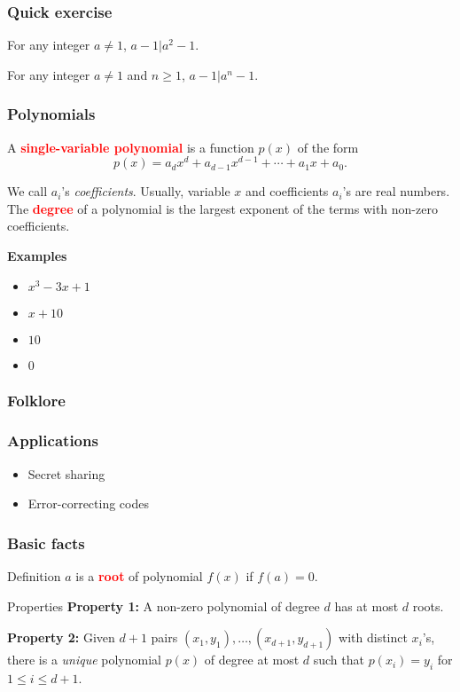 

\begin{frame}
  \frametitle{Quick exercise} 

  For any integer $a\neq 1$, $a-1|a^2-1$.

  \pause

  For any integer $a\neq 1$ and $n\geq 1$, $a-1|a^n-1$.

  \vspace{3in}
\end{frame}

\begin{frame}
  \frametitle{Polynomials}

  A \textcolor{red}{\bf single-variable polynomial} is a function
  $p(x)$ of the form
  \[
  p(x) = a_dx^d+a_{d-1}x^{d-1}+\cdots+a_1x+a_0.
  \]

  We call $a_i$'s {\em coefficients}.  Usually, variable $x$ and
  coefficients $a_i$'s are real numbers.  The \textcolor{red}{\bf
    degree} of a polynomial is the largest exponent of the terms with
  non-zero coefficients.
  
  \vspace{0.2in}

  {\bf Examples}
  \begin{itemize}
  \item $x^3-3x+1$
  \item $x+10$
  \item $10$
  \item $0$
  \end{itemize}
\end{frame}

\begin{frame}
  \frametitle{Folklore}
\end{frame}

\begin{frame}
  \frametitle{Applications}
  \begin{itemize}
  \item Secret sharing
    \pause
  \item Error-correcting codes
  \end{itemize}
\end{frame}

\begin{frame}
  \frametitle{Basic facts}

  \begin{block}{Definition}
    $a$ is a \textcolor{red}{\bf root} of polynomial $f(x)$ if
    $f(a)=0$.
  \end{block}
  
  \begin{block}{Properties}
    {\bf Property 1:} A non-zero polynomial of degree $d$ has at most
    $d$ roots.

    {\bf Property 2:} Given $d+1$ pairs
    $(x_1,y_1),\ldots,(x_{d+1},y_{d+1})$ with distinct $x_i$'s, there
    is a {\em unique} polynomial $p(x)$ of degree at most $d$ such
    that $p(x_i)=y_i$ for $1\leq i\leq d+1$.
  \end{block}
\end{frame}

